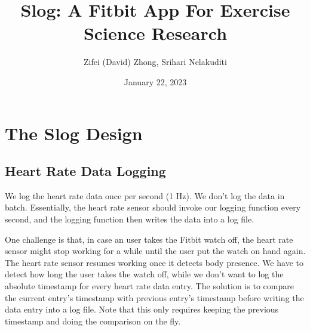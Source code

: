 \documentclass[11pt, oneside]{article}   	%
\title{Slog: A Fitbit App For Exercise Science Research}
\author{Zifei (David) Zhong, Srihari Nelakuditi}
\date{January 22, 2023}							%
\begin{document}
\maketitle

\section{The Slog Design}
\subsection{Heart Rate Data Logging}
We log the heart rate data once per second (1 Hz). We don't log the data in batch. Essentially, the heart rate sensor should invoke our logging function every second, and the logging function then writes the data into a log file.

One challenge is that, in case an user takes the Fitbit watch off, the heart rate sensor might stop working for a while until the user put the watch on hand again. The heart rate sensor resumes working once it detects body presence. We have to detect how long the user takes the watch off, while we don't want to log the absolute timestamp for every heart rate data entry. The solution is to compare the current entry's timestamp with previous entry's timestamp before writing the data entry into a log file. Note that this only requires keeping the previous timestamp and doing the comparison on the fly.
\end{document}
